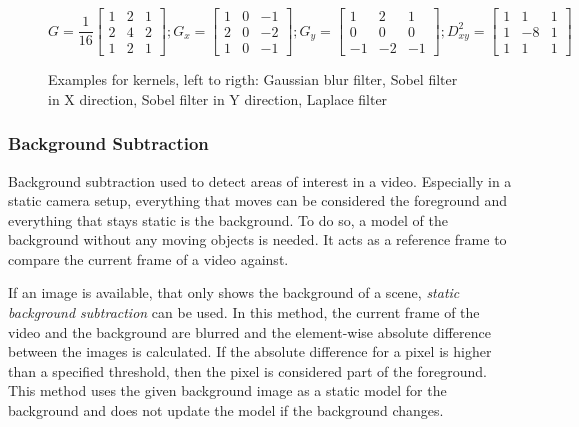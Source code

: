 \begin{figure}[h!]
\begin{equation*}
    G = 
    \dfrac{1}{16}
    \begin{bmatrix}
    1 & 2 & 1 \\
    2 & 4 & 2 \\
    1 & 2 & 1
    \end{bmatrix}
    ;
    G_x = 
    \begin{bmatrix}
    1 & 0 & -1 \\
    2 & 0 & -2 \\
    1 & 0 & -1
    \end{bmatrix}
    ;
    G_y = 
    \begin{bmatrix}
    1 & 2 & 1 \\
    0 & 0 & 0 \\
    -1 & -2 & -1
    \end{bmatrix}
    ;
    D_{xy}^{2} = 
    \begin{bmatrix}
    1 & 1 & 1 \\
    1 & -8 & 1 \\
    1 & 1 & 1
    \end{bmatrix}
\end{equation*}
\caption[Examples for kernels]{Examples for kernels, left to rigth: Gaussian blur filter, Sobel filter in X direction, Sobel filter in Y direction, Laplace filter}
\label{fig:sota:kernels}
\end{figure}

\subsubsection{Background Subtraction}
Background subtraction used to detect areas of interest in a video.
Especially in a static camera setup, everything that moves can be considered the foreground and everything that stays static is the background. 
To do so, a model of the background without any moving objects is needed.
It acts as a reference frame to compare the current frame of a video against.

If an image is available, that only shows the background of a scene,
\emph{static background subtraction} can be used.
In this method, the current frame of the video and the background are blurred 
and the element-wise absolute difference between the images is calculated.
If the absolute difference for a pixel is higher than a specified threshold, then the pixel is considered part of the foreground.
This method uses the given background image as a static model for the background and does not update the model if the background changes.


